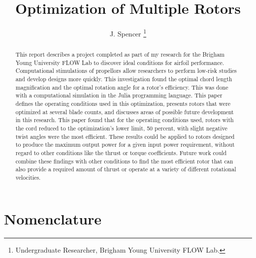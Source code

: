 \documentclass[journal ]{new-aiaa}
\title{Optimization of Multiple Rotors}
\author{J. Spencer \footnote{Undergraduate Researcher, Brigham Young University FLOW Lab.}}
\affil{Brigham Young University, Provo, Utah, 84601}
\begin{document}
\maketitle

\begin{abstract}

This report describes a project completed as part of my research for the Brigham Young University FLOW Lab to discover ideal conditions for airfoil performance. Computational stimulations of propellors allow researchers to perform low-risk studies and develop designs more quickly. This investigation found the optimal chord length magnification and the optimal rotation angle for a rotor's efficiency. This was done with a computational simulation in the Julia programming language. This paper defines the operating conditions used in this optimization, presents rotors that were optimized at several blade counts, and discusses areas of possible future development in this research. This paper found that for the operating conditions used, rotors with the cord reduced to the optimization's lower limit, 50 percent, with slight negative twist angles were the most efficient. These results could be applied to rotors designed to produce the maximum output power for a given input power requirement, without regard to other conditions like the thrust or torque coefficients. Future work could combine these findings with other conditions to find the most efficient rotor that can also provide a required amount of thrust or operate at a variety of different rotational velocities.

\end{abstract}


\section*{Nomenclature}
\end{document}
